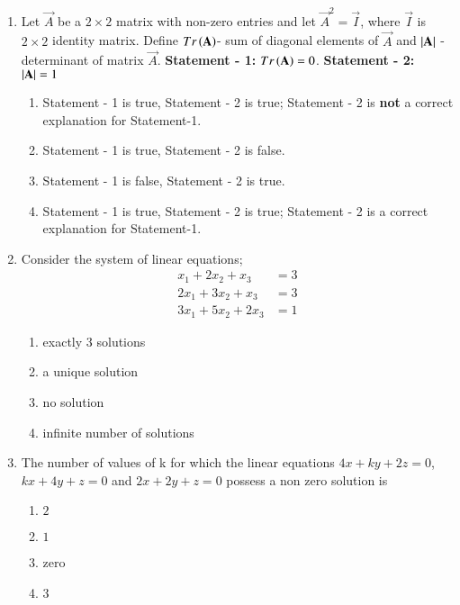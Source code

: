 \documentclass[journal,onecolumn]{IEEEtran}
\theoremstyle{remark}
\begin{document}
\begin{enumerate}
	\item Let $\vec{A}$ be a $2\times2$ matrix with non-zero entries and let $\vec{A}^2 = \vec{I}$, where $\vec{I}$ is $2\times2$ identity matrix. Define 
	\newline
	$Tr\left(\mathbf{A}\right)$- sum of diagonal elements of $\vec{A}$ and
	\newline
	$\left\vert\mathbf{A}\right\vert$ - determinant of matrix $\vec{A}$.
	\newline
	\textbf{Statement - 1:} $Tr\left(\mathbf{A}\right) = 0$.
	\newline
	\textbf{Statement - 2:} $\left\vert\mathbf{A}\right\vert = 1$

	\hfill{}
	\begin{enumerate}
		\item Statement - 1 is true, Statement - 2 is true; Statement - 2 is \textbf{not} a correct explanation for Statement-1. 
	    	\item Statement - 1 is true, Statement - 2 is false. 
	    	\item Statement - 1 is false, Statement - 2 is true.
	    	\item Statement - 1 is true, Statement - 2 is true; Statement - 2 is a correct explanation for Statement-1. 
	\end{enumerate}

    \item Consider the system of linear equations;
	\begin{align*}
		x_1 + 2x_2 + x_3 &= 3\\
		2x_1 + 3x_2 + x_3 &= 3\\
		3x_1 + 5x_2 + 2x_3 &= 1
	\end{align*}
	\hfill{}{\par}
	\begin{enumerate}
		\item exactly $3$ solutions
	    	\item a unique solution
	    	\item no solution
	    	\item infinite number of solutions
	\end{enumerate}

    \item The number of values of k for which the linear equations $4x + ky + 2z = 0$, $kx + 4y + z = 0$ and $2x + 2y + z=0$ possess a non zero solution is 
	\hfill {}{\par}
        \begin{enumerate}
                \item $2$
                \item $1$
                \item zero
                \item $3$
        \end{enumerate}


\end{enumerate}
\end{document}
